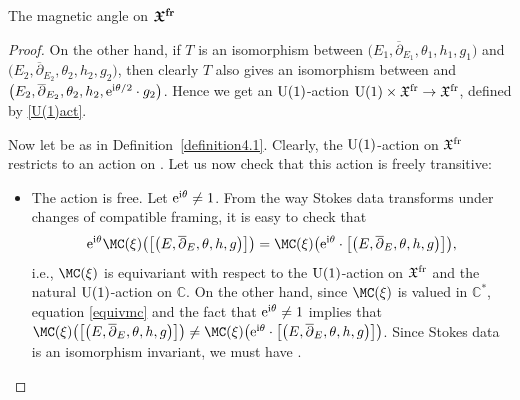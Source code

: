 \begin{subsubsection}{The magnetic angle on $\boldsymbol{\mathfrak{X}^{{\rm fr}}}$}
\begin{proof}
On the other hand, if $T$ is an isomorphism between $\bigl(E_1,\overline{\partial}_{E_1},\theta_1,h_1,g_1\bigr)$ and $\bigl(E_2,\overline{\partial}_{E_2},\theta_2,\allowbreak h_2, g_2\bigr)$, then clearly $T$ also gives an isomorphism between  and $ \smash{\bigl(E_2,\overline{\partial}_{E_2}},\allowbreak\theta_2, \smash{ h_2,{\rm e}^{{\rm i}\theta/2}\cdot g_2\bigr)}$. Hence we get an ${\rm U}(1)$-action ${\rm U}(1)\times \mathfrak{X}^{{\rm fr}}\to \mathfrak{X}^{{\rm fr}}$, defined by \eqref{U(1)act}.

Now let  be as in Definition~\ref{definition4.1}. Clearly, the ${\rm U}(1)$-action on $\mathfrak{X}^{{\rm fr}}$ restricts to an action on . Let us now check that this action is freely transitive:
\begin{itemize}\itemsep=0pt
 \item The action is free. Let ${\rm e}^{{\rm i}\theta}\neq 1$. From the way Stokes data transforms under changes of compatible framing, it is easy to check that
 \begin{equation}\label{equivmc}
 {\rm e}^{{\rm i}\theta}\MC(\xi)\bigl(\bigl[\bigl(E,\overline{\partial}_E,\theta,h,g\bigr)\bigr]\bigr)=\MC(\xi)\bigl({\rm e}^{{\rm i}\theta}\cdot \bigl[\bigl(E,\overline{\partial}_E,\theta,h,g\bigr)\bigr]\bigr),
 \end{equation}
 i.e., $\MC(\xi)$ is equivariant with respect to the ${\rm U}(1)$-action on $\mathfrak{X}^{{\rm fr}}$ and the natural ${\rm U}(1)$-action on $\mathbb{C}$. On the other hand, since $\MC(\xi)$ is valued in $\mathbb{C}^*$, equation \eqref{equivmc} and the fact that ${\rm e}^{{\rm i}\theta}\neq 1$ implies that $\MC(\xi)\bigl(\bigl[\bigl(E,\overline{\partial}_E,\theta,h,g\bigr)\bigr]\bigr)\neq \MC(\xi)\bigl({\rm e}^{{\rm i}\theta}\cdot\bigl[\bigl(E,\overline{\partial}_E,\theta,h,g\bigr)\bigr]\bigr)$. Since Stokes data is an isomorphism invariant, we must have .

\end{itemize}
\end{proof}
\end{subsubsection}
